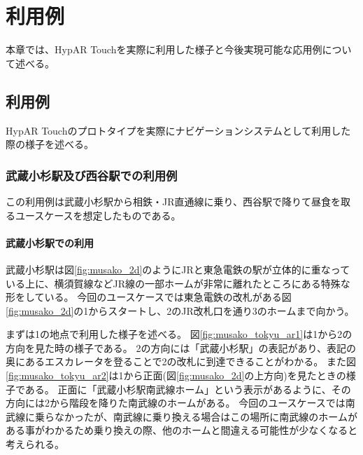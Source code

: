 \chapter{利用例}
\label{chap:usage}

本章では、HypAR Touchを実際に利用した様子と今後実現可能な応用例について述べる。

\newpage

\section{利用例}
HypAR Touchのプロトタイプを実際にナビゲーションシステムとして利用した際の様子を述べる。

\subsection{武蔵小杉駅及び西谷駅での利用例}
この利用例は武蔵小杉駅から相鉄・JR直通線に乗り、西谷駅で降りて昼食を取るユースケースを想定したものである。

\subsubsection{武蔵小杉駅での利用}
武蔵小杉駅は図\ref{fig:musako_2d}のようにJRと東急電鉄の駅が立体的に重なっている上に、横須賀線などJR線の一部ホームが非常に離れたところにある特殊な形をしている。
今回のユースケースでは東急電鉄の改札がある図\ref{fig:musako_2d}の\textcircled{\scriptsize{1}}からスタートし、\textcircled{\scriptsize{2}}のJR改札口を通り\textcircled{\scriptsize{3}}のホームまで向かう。

まずは\textcircled{\scriptsize{1}}の地点で利用した様子を述べる。
図\ref{fig:musako_tokyu_ar1}は\textcircled{\scriptsize{1}}から\textcircled{\scriptsize{2}}の方向を見た時の様子である。
\textcircled{\scriptsize{2}}の方向には「武蔵小杉駅」の表記があり、表記の奥にあるエスカレータを登ることで\textcircled{\scriptsize{2}}の改札に到達できることがわかる。
また図\ref{fig:musako_tokyu_ar2}は\textcircled{\scriptsize{1}}から正面(図\ref{fig:musako_2d}の上方向)を見たときの様子である。
正面に「武蔵小杉駅南武線ホーム」という表示があるように、その方向には\textcircled{\scriptsize{2}}から階段を降りた南武線のホームがある。
今回のユースケースでは南武線に乗らなかったが、南武線に乗り換える場合はこの場所に南武線のホームがある事がわかるため乗り換えの際、他のホームと間違える可能性が少なくなると考えられる。

